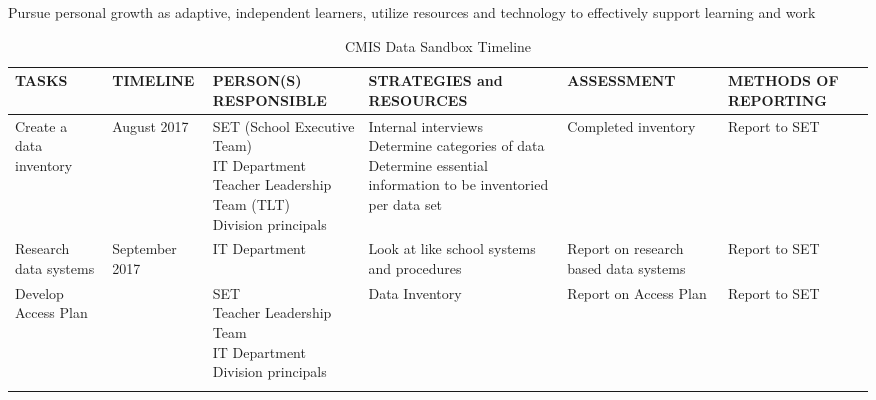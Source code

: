 Pursue personal growth as adaptive, independent learners, utilize resources and technology to effectively support learning and work 
\begin{landscape}
\begin{table}[h]
\small
\centering
\caption{CMIS Data Sandbox Timeline}
\label{table:1}
\begin{tabu} to 8in {|X[2]|X|X[2]|X[2]|X[2]|X|}
\hline
TASKS &
TIMELINE &
PERSON(S) RESPONSIBLE &
STRATEGIES and RESOURCES &
ASSESSMENT &
METHODS OF REPORTING  \\
\hline

Create a data inventory &
August 2017 &
\parbox[t]{3.25cm}{
SET (School Executive Team) \\ 
IT Department \\
Teacher Leadership Team (TLT) \\ 
Division principals}  &
\parbox[t]{3.5cm}{
Internal interviews \\
Determine categories of data \\
Determine essential information to be inventoried per data set} &
Completed inventory &
Report to SET \\
\hline

Research data systems &
September 2017 &
IT Department &
Look at like school systems and procedures &
Report on research based data systems &
Report to SET \\
\hline

Develop Access Plan &
&
\parbox[t]{3cm}{
SET \\
Teacher Leadership Team \\
IT Department \\
Division principals} &
Data Inventory  &
Report on Access Plan &
Report to SET \\
\hline
{}
\end{tabu}
\end{table}
\end{landscape}

